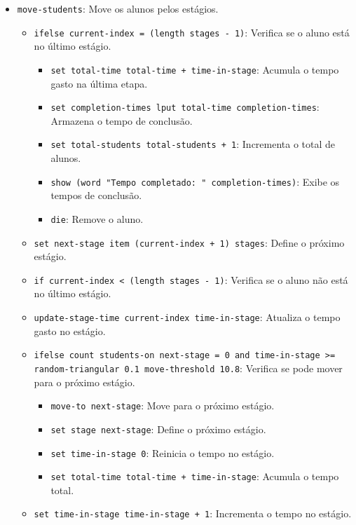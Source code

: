 \documentclass{article}
\begin{document}
\begin{itemize}
    \item \texttt{move-students}: Move os alunos pelos estágios.
    \begin{itemize}
        \item \texttt{ifelse current-index = (length stages - 1)}: Verifica se o aluno está no último estágio.
        \begin{itemize}
            \item \texttt{set total-time total-time + time-in-stage}: Acumula o tempo gasto na última etapa.
            \item \texttt{set completion-times lput total-time completion-times}: Armazena o tempo de conclusão.
            \item \texttt{set total-students total-students + 1}: Incrementa o total de alunos.
            \item \texttt{show (word "Tempo completado: " completion-times)}: Exibe os tempos de conclusão.
            \item \texttt{die}: Remove o aluno.
        \end{itemize}
        \item \texttt{set next-stage item (current-index + 1) stages}: Define o próximo estágio.
        \item \texttt{if current-index < (length stages - 1)}: Verifica se o aluno não está no último estágio.
        \item \texttt{update-stage-time current-index time-in-stage}: Atualiza o tempo gasto no estágio.
        \item \texttt{ifelse count students-on next-stage = 0 and time-in-stage >= random-triangular 0.1 move-threshold 10.8}: Verifica se pode mover para o próximo estágio.
        \begin{itemize}
            \item \texttt{move-to next-stage}: Move para o próximo estágio.
            \item \texttt{set stage next-stage}: Define o próximo estágio.
            \item \texttt{set time-in-stage 0}: Reinicia o tempo no estágio.
            \item \texttt{set total-time total-time + time-in-stage}: Acumula o tempo total.
        \end{itemize}
        \item \texttt{set time-in-stage time-in-stage + 1}: Incrementa o tempo no estágio.
    \end{itemize}
\end{itemize}
\end{document}
